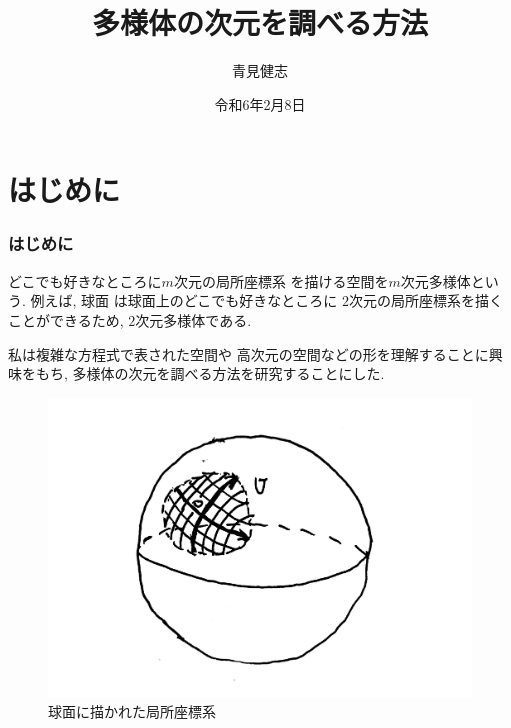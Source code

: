 \documentclass[dvipdfmx,cjk]{beamer}
\theoremstyle{definition}
\begin{document}
\title[多様体の次元を調べる方法]{多様体の次元を調べる方法} 
\author[青見健志]{青見健志}            %
\date{令和6年2月8日}

\begin{frame}                  %
\titlepage                     %
\end{frame}

\begin{frame}                  %
\tableofcontents
\end{frame}

\section{はじめに}
\begin{frame}
\frametitle{はじめに} 
どこでも好きなところに$m$次元の局所座標系
を描ける空間を$m$次元多様体という. 例えば, 球面
は球面上のどこでも好きなところに
$2$次元の局所座標系を描くことができるため, 
$2$次元多様体である.  

私は複雑な方程式で表された空間や
高次元の空間などの形を理解することに興味をもち, 
多様体の次元を調べる方法を研究することにした. 
  \begin{figure}[]
    \centering
    \includegraphics[keepaspectratio, scale=0.2]
         {CoSysInS2.pdf}
    \caption{球面に描かれた局所座標系}
    \label{CoSysInS2}
   \end{figure}
\end{frame}
\end{document}
